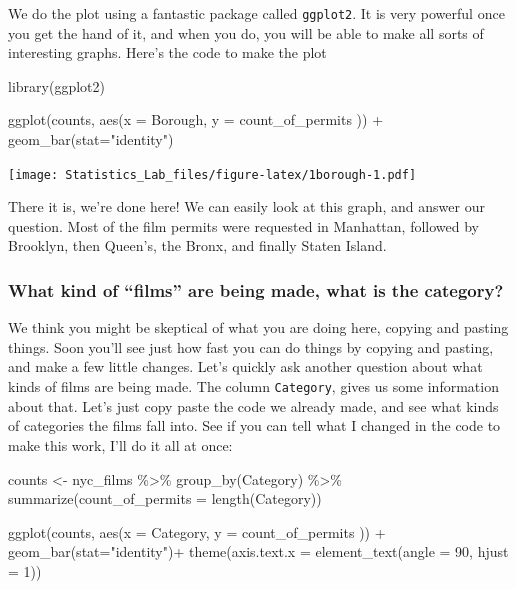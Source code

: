 \documentclass[
]{book}
\newenvironment{Shaded}{\begin{snugshade}}{\end{snugshade}}
\newcommand{\AttributeTok}[1]{\textcolor[rgb]{0.77,0.63,0.00}{#1}}
\newcommand{\DecValTok}[1]{\textcolor[rgb]{0.00,0.00,0.81}{#1}}
\newcommand{\FunctionTok}[1]{\textcolor[rgb]{0.00,0.00,0.00}{#1}}
\newcommand{\NormalTok}[1]{#1}
\newcommand{\OtherTok}[1]{\textcolor[rgb]{0.56,0.35,0.01}{#1}}
\newcommand{\SpecialCharTok}[1]{\textcolor[rgb]{0.00,0.00,0.00}{#1}}
\newcommand{\StringTok}[1]{\textcolor[rgb]{0.31,0.60,0.02}{#1}}
\begin{document}
We do the plot using a fantastic package called \texttt{ggplot2}. It is very powerful once you get the hand of it, and when you do, you will be able to make all sorts of interesting graphs. Here's the code to make the plot

\begin{Shaded}
\begin{Highlighting}[]
\FunctionTok{library}\NormalTok{(ggplot2)}

\FunctionTok{ggplot}\NormalTok{(counts, }\FunctionTok{aes}\NormalTok{(}\AttributeTok{x =}\NormalTok{ Borough, }\AttributeTok{y =}\NormalTok{ count\_of\_permits )) }\SpecialCharTok{+}
  \FunctionTok{geom\_bar}\NormalTok{(}\AttributeTok{stat=}\StringTok{"identity"}\NormalTok{)}
\end{Highlighting}
\end{Shaded}

\texttt{[image: Statistics\_Lab\_files/figure-latex/1borough-1.pdf]}

There it is, we're done here! We can easily look at this graph, and answer our question. Most of the film permits were requested in Manhattan, followed by Brooklyn, then Queen's, the Bronx, and finally Staten Island.

\hypertarget{what-kind-of-films-are-being-made-what-is-the-category}{%
\subsubsection{What kind of ``films'' are being made, what is the category?}\label{what-kind-of-films-are-being-made-what-is-the-category}}

We think you might be skeptical of what you are doing here, copying and pasting things. Soon you'll see just how fast you can do things by copying and pasting, and make a few little changes. Let's quickly ask another question about what kinds of films are being made. The column \texttt{Category}, gives us some information about that. Let's just copy paste the code we already made, and see what kinds of categories the films fall into. See if you can tell what I changed in the code to make this work, I'll do it all at once:

\begin{Shaded}
\begin{Highlighting}[]
\NormalTok{counts }\OtherTok{\textless{}{-}}\NormalTok{ nyc\_films }\SpecialCharTok{\%\textgreater{}\%}
          \FunctionTok{group\_by}\NormalTok{(Category) }\SpecialCharTok{\%\textgreater{}\%}
          \FunctionTok{summarize}\NormalTok{(}\AttributeTok{count\_of\_permits =} \FunctionTok{length}\NormalTok{(Category))}

\FunctionTok{ggplot}\NormalTok{(counts, }\FunctionTok{aes}\NormalTok{(}\AttributeTok{x =}\NormalTok{ Category, }\AttributeTok{y =}\NormalTok{ count\_of\_permits )) }\SpecialCharTok{+}
  \FunctionTok{geom\_bar}\NormalTok{(}\AttributeTok{stat=}\StringTok{"identity"}\NormalTok{)}\SpecialCharTok{+} 
  \FunctionTok{theme}\NormalTok{(}\AttributeTok{axis.text.x =} \FunctionTok{element\_text}\NormalTok{(}\AttributeTok{angle =} \DecValTok{90}\NormalTok{, }\AttributeTok{hjust =} \DecValTok{1}\NormalTok{))}
\end{Highlighting}
\end{Shaded}
\end{document}
